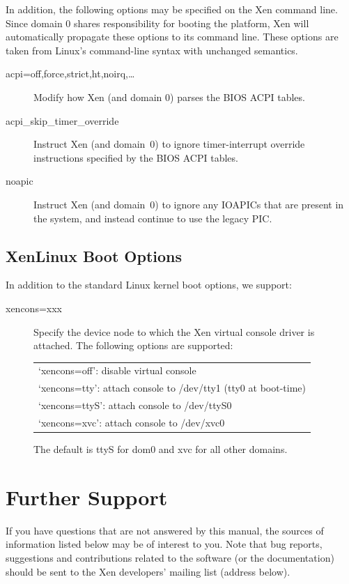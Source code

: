 \documentclass[11pt,twoside,final,openright]{report}
\begin{document}
In addition, the following options may be specified on the Xen command
line. Since domain 0 shares responsibility for booting the platform,
Xen will automatically propagate these options to its command line.
These options are taken from Linux's command-line syntax with
unchanged semantics.

\begin{description}
\item [ acpi=off,force,strict,ht,noirq,\ldots ] Modify how Xen (and
  domain 0) parses the BIOS ACPI tables.
\item [ acpi\_skip\_timer\_override ] Instruct Xen (and domain~0) to
  ignore timer-interrupt override instructions specified by the BIOS
  ACPI tables.
\item [ noapic ] Instruct Xen (and domain~0) to ignore any IOAPICs
  that are present in the system, and instead continue to use the
  legacy PIC.
\end{description} 


\section{XenLinux Boot Options}

In addition to the standard Linux kernel boot options, we support:
\begin{description}
\item[ xencons=xxx ] Specify the device node to which the Xen virtual
  console driver is attached. The following options are supported:
  \begin{center}
    \begin{tabular}{l}
      `xencons=off': disable virtual console \\
      `xencons=tty': attach console to /dev/tty1 (tty0 at boot-time) \\
      `xencons=ttyS': attach console to /dev/ttyS0 \\
      `xencons=xvc': attach console to /dev/xvc0
    \end{tabular}
\end{center}
The default is ttyS for dom0 and xvc for all other domains.
\end{description}


\chapter{Further Support}

If you have questions that are not answered by this manual, the
sources of information listed below may be of interest to you.  Note
that bug reports, suggestions and contributions related to the
software (or the documentation) should be sent to the Xen developers'
mailing list (address below).
\end{document}

